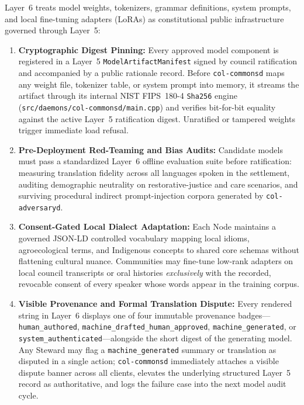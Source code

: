 Layer~6 treats model weights, tokenizers, grammar definitions, system prompts, and local fine-tuning adapters (LoRAs) as constitutional public infrastructure governed through Layer~5:
\begin{enumerate}
  \item \textbf{Cryptographic Digest Pinning:} Every approved model component is registered in a Layer~5 \texttt{ModelArtifactManifest} signed by council ratification and accompanied by a public rationale record. Before \texttt{col-commonsd} maps any weight file, tokenizer table, or system prompt into memory, it streams the artifact through its internal NIST FIPS~180-4 \texttt{Sha256} engine (\texttt{src/daemons/col-commonsd/main.cpp}) and verifies bit-for-bit equality against the active Layer~5 ratification digest. Unratified or tampered weights trigger immediate load refusal.
  \item \textbf{Pre-Deployment Red-Teaming and Bias Audits:} Candidate models must pass a standardized Layer~6 offline evaluation suite before ratification: measuring translation fidelity across all languages spoken in the settlement, auditing demographic neutrality on restorative-justice and care scenarios, and surviving procedural indirect prompt-injection corpora generated by \texttt{col-adversaryd}.
  \item \textbf{Consent-Gated Local Dialect Adaptation:} Each Node maintains a governed JSON-LD controlled vocabulary mapping local idioms, agroecological terms, and Indigenous concepts to shared core schemas without flattening cultural nuance. Communities may fine-tune low-rank adapters on local council transcripts or oral histories \emph{exclusively} with the recorded, revocable consent of every speaker whose words appear in the training corpus.
  \item \textbf{Visible Provenance and Formal Translation Dispute:} Every rendered string in Layer~6 displays one of four immutable provenance badges---\texttt{human\_authored}, \texttt{machine\_drafted\_human\_approved}, \texttt{machine\_generated}, or \texttt{system\_authenticated}---alongside the short digest of the generating model. Any Steward may flag a \texttt{machine\_generated} summary or translation as disputed in a single action; \texttt{col-commonsd} immediately attaches a visible dispute banner across all clients, elevates the underlying structured Layer~5 record as authoritative, and logs the failure case into the next model audit cycle.
\end{enumerate}

